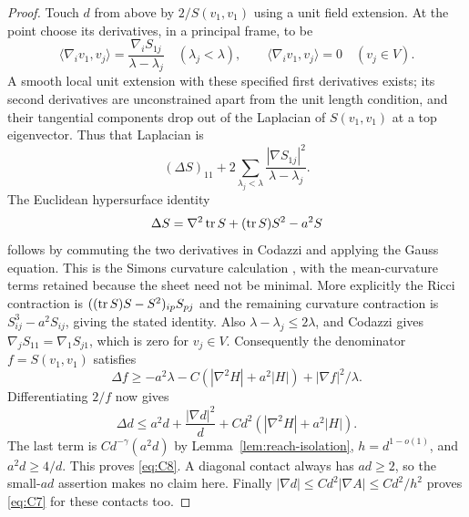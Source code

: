 \begin{proof}
Touch $d$ from above by $2/S(v_1,v_1)$ using a unit field extension.
At the point choose its derivatives, in a principal frame, to be
\[
 \langle\nabla_i v_1,v_j\rangle
 =\frac{\nabla_iS_{1j}}{\lambda-\lambda_j}
 \quad(\lambda_j<\lambda),
 \qquad \langle\nabla_i v_1,v_j\rangle=0\quad(v_j\in V).
\]
A smooth local unit extension with these specified first derivatives
exists; its second derivatives are unconstrained apart from the unit
length condition, and their tangential components drop out of the
Laplacian of $S(v_1,v_1)$ at a top eigenvector.  Thus that Laplacian is
\[
 (\Delta S)_{11}
 +2\sum_{\lambda_j<\lambda}
             \frac{|\nabla S_{1j}|^2}{\lambda-\lambda_j}.
\]
The Euclidean hypersurface identity
\begin{equation}\label{eq:reach-simons}
 \Delta S=\nabla^2\operatorname{tr} S+(\operatorname{tr} S)S^2-a^2S
\end{equation}
follows by commuting the two derivatives in Codazzi and applying
the Gauss equation.  This is the Simons curvature calculation
\cite{Simons1968,SchoenSimonYau1975}, with the mean-curvature terms
retained because the sheet need not be minimal.
More explicitly the Ricci contraction is
$((\operatorname{tr} S)S-S^2)_{ip}S_{pj}$ and the remaining curvature contraction
is $S^3_{ij}-a^2S_{ij}$, giving the stated identity.  Also
$\lambda-\lambda_j\le2\lambda$, and Codazzi gives
$\nabla_jS_{11}=\nabla_1S_{j1}$, which is zero for $v_j\in V$.
Consequently the denominator $f=S(v_1,v_1)$ satisfies
\[
 \Delta f\ge-a^2\lambda
 -C(|\nabla^2H|+a^2|H|)+|\nabla f|^2/\lambda.
\]
Differentiating $2/f$ now gives
\[
 \Delta d\le a^2d+\frac{|\nabla d|^2}{d}
 +C d^2(|\nabla^2H|+a^2|H|).
\]
The last term is $C d^{-\gamma}(a^2d)$ by
Lemma~\ref{lem:reach-isolation}, $h=d^{1-o(1)}$, and
$a^2d\ge4/d$.  This proves \eqref{eq:C8}.  A diagonal contact
always has $ad\ge2$, so the small-$ad$ assertion makes no claim here.
Finally $|\nabla d|\le Cd^2|\nabla A|\le Cd^2/h^2$ proves
\eqref{eq:C7} for these contacts too.


\end{proof}
